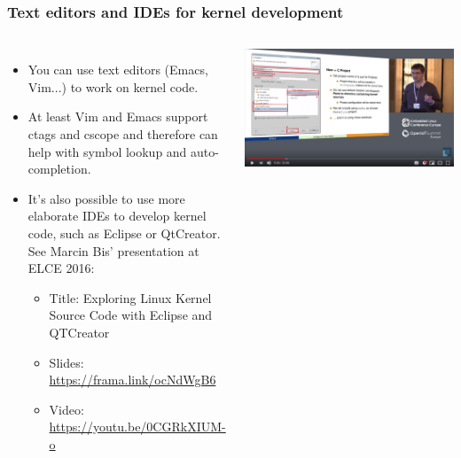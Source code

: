 \begin{frame}
  \frametitle{Text editors and IDEs for kernel development}
  \begin{columns}
    \begin{itemize}
    \item You can use text editors (Emacs, Vim...) to work on kernel code.
    \item At least Vim and Emacs support ctags and cscope and therefore
          can help with symbol lookup and auto-completion.
    \item It's also possible to use more elaborate IDEs to develop
          kernel code, such as Eclipse or QtCreator.
          See Marcin Bis' presentation at ELCE 2016:
          \begin{itemize}
          \item Title: Exploring Linux Kernel Source Code with Eclipse and QTCreator
          \item Slides: \url{https://frama.link/ocNdWgB6}
          \item Video: \url{https://youtu.be/0CGRkXIUM-o}
          \end{itemize}
    \end{itemize}
    \includegraphics[width=\textwidth]{slides/kernel-source-code-management/marcin-bis-kernel-with-eclipse-and-qtcreator.jpg}
  \end{columns}
\end{frame}
